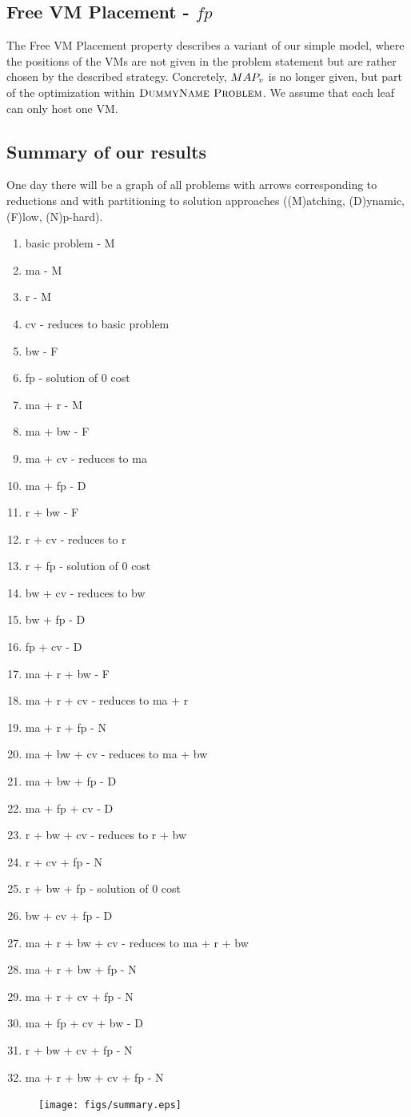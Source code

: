 \subsection{Free VM Placement - $fp$}

The Free VM Placement property describes a variant of our simple model, where 
the positions of the VMs are not given in the problem statement but are 
rather chosen by the described strategy. Concretely, $MAP_v$ is no 
longer given, but part of the optimization within $\textsc{DummyName Problem}$. We assume that 
each leaf can only host one VM.


\subsection{Summary of our results}

One day there will be a graph of all problems with arrows
corresponding to reductions and with partitioning to solution
approaches ((M)atching, (D)ynamic, (F)low, (N)p-hard).

\begin{enumerate}
\item basic problem - M
\item ma - M
\item r - M
\item cv - reduces to basic problem
\item bw - F
\item fp - solution of 0 cost
\item ma + r - M
\item  ma + bw - F
\item ma + cv - reduces to ma
\item ma + fp - D
\item r + bw - F
\item r + cv - reduces to r
\item r + fp - solution of 0 cost
\item bw + cv - reduces to bw
\item bw + fp - D
\item fp + cv - D
\item ma + r + bw - F
\item ma + r + cv - reduces to ma + r
\item ma + r + fp - N
\item ma + bw + cv - reduces to ma + bw
\item ma + bw + fp - D
\item ma + fp + cv - D
\item r + bw + cv - reduces to r + bw
\item r + cv + fp - N
\item r + bw + fp - solution of 0 cost
\item bw + cv + fp - D
\item ma + r + bw + cv - reduces to ma + r + bw
\item ma + r + bw + fp - N
\item ma + r + cv + fp - N
\item ma + fp + cv + bw - D
\item r + bw + cv + fp - N
\item ma + r + bw + cv + fp - N
\end{enumerate}


\begin{figure}[htbp]
\texttt{[image: figs/summary.eps]}
\end{figure}

